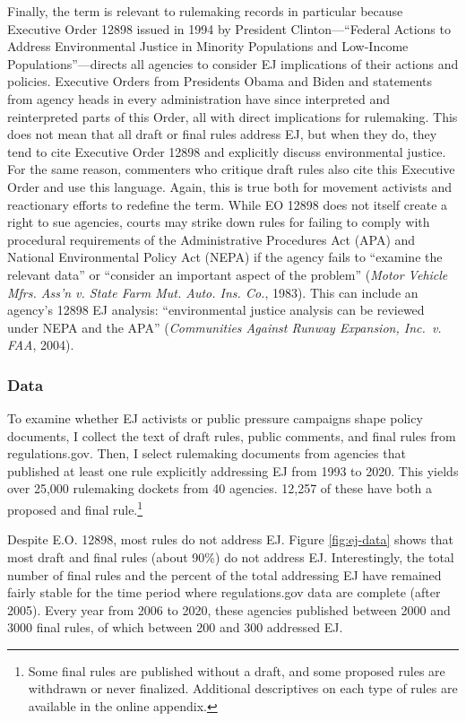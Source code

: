 \documentclass[
      12pt,
        ]{article}
\begin{document}
Finally, the term is relevant to rulemaking records in
particular because Executive Order 12898 issued in 1994 by President
Clinton---``Federal Actions to Address Environmental Justice in Minority
Populations and Low-Income Populations''---directs all agencies to consider EJ implications of their actions and policies. Executive Orders from Presidents Obama and Biden and statements from agency heads in every administration have since interpreted and reinterpreted parts of this Order, all with direct implications for rulemaking.
This does not mean that all draft or final rules address EJ, but when they
do, they tend to cite Executive Order 12898 and explicitly discuss
environmental justice. For the same reason, commenters who critique draft rules also cite this Executive Order and use this language. Again, this is true both for movement activists and reactionary efforts to redefine the term.
While EO 12898 does not itself create a right to sue agencies, courts may strike down rules for failing to comply with procedural requirements of the Administrative Procedures Act (APA) and National Environmental Policy Act (NEPA) if the agency fails to ``examine the relevant data'' or ``consider an important aspect of the problem'' (\emph{Motor Vehicle Mfrs. Ass'n v. State Farm Mut. Auto. Ins. Co.}, 1983). This can include an agency's 12898 EJ analysis: ``environmental justice analysis can be reviewed under NEPA and the APA'' (\emph{Communities Against Runway Expansion, Inc.~v. FAA}, 2004).

\hypertarget{data}{%
\subsubsection{Data}\label{data}}

To examine whether EJ activists or public pressure campaigns shape policy documents,
I collect the text of draft rules, public comments, and final rules from regulations.gov. Then, I select rulemaking documents from agencies that published at least one rule explicitly addressing EJ from 1993 to 2020. This yields over 25,000 rulemaking dockets from 40 agencies. 12,257 of these have both a proposed and final rule.\footnote{Some final rules are published without a draft, and some proposed rules are withdrawn or never finalized. Additional descriptives on each type of rules are available in the online appendix.}

Despite E.O. 12898, most rules do not address EJ. Figure \ref{fig:ej-data} shows that most draft and final rules (about 90\%) do not address EJ. Interestingly, the total number of final rules and the percent of the total addressing EJ have remained fairly stable for the time period where regulations.gov data are complete (after 2005). Every year from 2006 to 2020, these agencies published between 2000 and 3000 final rules, of which between 200 and 300 addressed EJ.
\end{document}
